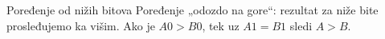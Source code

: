 
\begin{frame}[label=05-s008]{Poređenje od nižih bitova}
\fontsize{10}{12}\selectfont
Poređenje „odozdo na gore“: rezultat za niže bite prosleđujemo ka višim.
Ako je $A0>B0$, tek uz $A1=B1$ sledi $A>B$.\par\vspace{2mm}
\centering\setlength{\parskip}{0pt}
\def\DEprosiren{2}\def\DEunit{.64cm}\def\DEyunit{.35cm}\par
{}
\end{frame}
